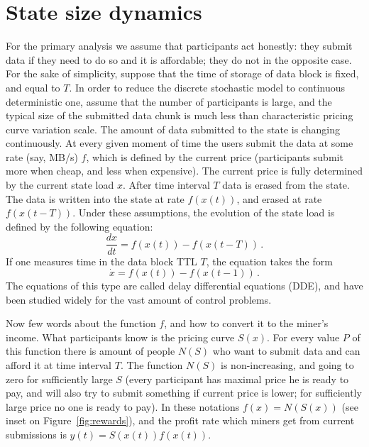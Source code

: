 \documentclass[]{llncs}   %
\begin{document}
\section{State size dynamics}
\label{apx:statesize}
For the primary analysis we assume that participants act honestly: they submit
data if they need to do so and it is affordable; they do not in the opposite
case. For the sake of simplicity, suppose that the time of storage of data
block is fixed, and equal to $T$. In order to reduce the discrete stochastic
model to continuous deterministic one, assume that the number of participants
is large, and the typical size of the submitted data chunk is much less than
characteristic pricing curve variation scale. The amount of data submitted to
the state is changing continuously. At every given moment of time the users
submit the data at some rate (say, MB/s) $f$, which is defined by the current
price (participants submit more when cheap, and less when expensive). The
current price is fully determined by the current state load $x$. After time
interval $T$ data is erased from the state. The data is written into the state
at rate $f(x(t))$, and erased at rate $f(x(t-T))$. Under these assumptions,
the evolution of the state load is defined by the following equation:
\begin{equation}
    \frac{dx}{dt} = f(x(t))-f(x(t-T))\,.
    \label{eq:dde0}
\end{equation}
If one measures time in the data block TTL $T$, the equation takes the form
\begin{equation}
    \dot{x} = f(x(t))-f(x(t-1))\,.
    \label{eq:dde1}
\end{equation}
The equations of this type are called delay differential equations (DDE), and have
been studied widely for the vast amount of control problems.

Now few words about the function $f$, and how to convert it to the miner's
income. What participants know is the pricing curve $S(x)$. For every value $P$
of this function there is amount of people $N(S)$ who want to submit data and
can afford it at time interval $T$. The function $N(S)$ is non-increasing, and
going to zero for sufficiently large $S$ (every participant has maximal price he
is ready to pay, and will also try to submit something if current price is
lower; for sufficiently large price no one is ready to pay). In these notations
$f(x)=N(S(x))$ (see inset on Figure~\ref{fig:rewards}), and the profit rate which
miners get from current submissions is $y(t) = S(x(t))f(x(t))$.
\end{document}

